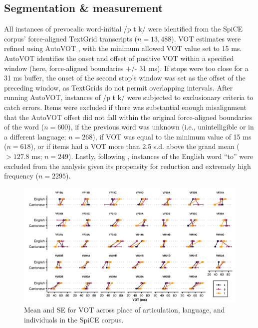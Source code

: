 \subsection{Segmentation \& measurement}
All instances of prevocalic word-initial /p t k/ were identified from the SpiCE corpus' force-aligned TextGrid transcripts ($n=13,488$). VOT estimates were refined using AutoVOT \citep{keshet_2014_autovot}, with the minimum allowed VOT value set to 15 ms. AutoVOT identifies the onset and offset of positive VOT within a specified window (here, force-aligned boundaries +/- 31 ms). If stops were too close for a 31 ms buffer, the onset of the second stop's window was set as the offset of the preceding window, as TextGrids do not permit overlapping intervals. After running AutoVOT, instances of /p t k/ were subjected to exclusionary criteria to catch errors. Items were excluded if there was substantial enough misalignment that the AutoVOT offset did not fall within the original force-aligned boundaries of the word ($n=600$), if the previous word was unknown (i.e., unintelligible or in a different language; $n=268$), if VOT was equal to the minimum value of 15 ms ($n=618$),  or if items had a VOT more than 2.5 s.d. above the grand mean ($>127.8$ ms; $n=249$). Lastly, following \citep{chodroff_2017_structure}, instances of the English word ``to'' were excluded from the analysis given its propensity for reduction and extremely high frequency ($n=2295$). 

\begin{figure}[hbtp]
  \centering
  \includegraphics[width=\linewidth]{figures/4-ptk_vot_individuals.png}
  \caption{Mean and SE for VOT across place of articulation, language, and individuals in the SpiCE corpus.}
  \label{fig:ids}
\end{figure}

